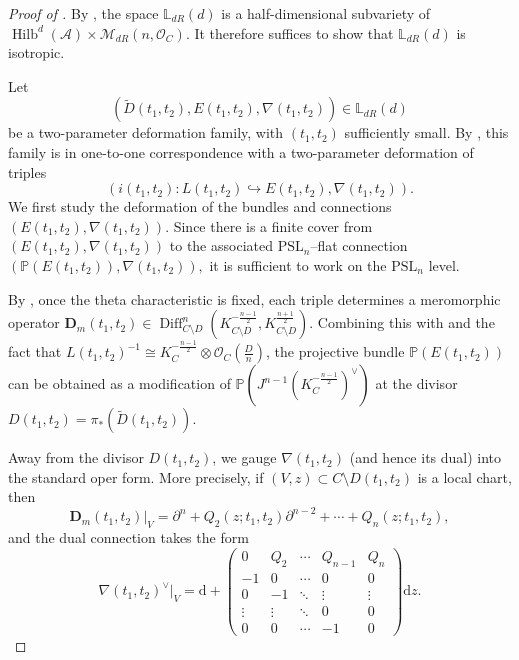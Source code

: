 \documentclass[10pt,a4paper]{amsart}
\begin{document}
\begin{proof}[Proof of ]
By , the space $\mathbb{L}_{dR}(d)$ is a half-dimensional subvariety of
\(
\operatorname{Hilb}^d(\mathcal A)\times \mathcal{M}_{dR}(n, \mathcal{O}_C).
\)
It therefore suffices to show that $\mathbb{L}_{dR}(d)$ is isotropic.

Let
\[
(\widetilde D(t_1,t_2),E(t_1,t_2),\nabla(t_1,t_2))
\in \mathbb{L}_{dR}(d)
\]
be a two-parameter deformation family, with $(t_1,t_2)$ sufficiently small.
By , this family is in one-to-one correspondence with a two-parameter deformation of triples
\begin{equation}\label{e: two para class dR}
(i(t_1,t_2)\colon L(t_1,t_2)\hookrightarrow E(t_1,t_2),\nabla(t_1,t_2)).
\end{equation}
We first study the deformation of the bundles and connections $(E(t_1,t_2),\nabla(t_1,t_2))$.
Since there is a finite cover from $(E(t_1,t_2),\nabla(t_1,t_2))$ to the associated
$\mathrm{PSL}_n$–flat connection
\(
(\mathbb P(E(t_1,t_2)),\nabla(t_1,t_2)),
\)
it is sufficient to work on the $\mathrm{PSL}_n$ level.

By , once the theta characteristic is fixed, each triple determines a meromorphic operator
\(
\mathbf D_m(t_1,t_2)\in \operatorname{Diff}^n_{C\setminus D} (K_{C\setminus D}^{-\frac{n-1}{2}}, K_{C\setminus D}^{\frac{n+1}{2}}).
\)
Combining this with  and the fact that $L(t_1,t_2)^{-1} \cong K_C^{-\frac{n-1}{2}}\otimes \mathcal{O}_C(\frac{D}{n})$, the projective bundle
$\mathbb P(E(t_1,t_2))$ can be obtained as a modification of $\mathbb P(J^{n-1}(K_C^{-\frac{n-1}{2}})^\vee)$ at the divisor
$D(t_1,t_2)=\pi_*(\widetilde D(t_1,t_2))$.

Away from the divisor $D(t_1,t_2)$, we gauge
$\nabla(t_1,t_2)$ (and hence its dual)
into the standard oper form.
More precisely, if $(V,z) \subset C\setminus D(t_1,t_2)$ is a local chart, then
\[
\mathbf D_m(t_1,t_2)\big|_V
=\partial^n+Q_2(z;t_1,t_2)\partial^{n-2}+\cdots+Q_n(z;t_1,t_2),
\]
and the dual connection takes the form
\begin{equation}\label{e: mero oper form dr lag}
\nabla(t_1,t_2)^{\vee}\big|_V
=\mathrm{d}+
\begin{pmatrix}
 0 & Q_2 & \cdots & Q_{n-1} & Q_{n} \\
 -1 & 0 & \cdots & 0 & 0\\
 0 & -1 & \ddots & \vdots & \vdots\\
 \vdots & \vdots & \ddots & 0 & 0\\
 0 & 0 & \cdots & -1 & 0
\end{pmatrix}\mathrm{d}z.
\end{equation}


\end{proof}
\end{document}
